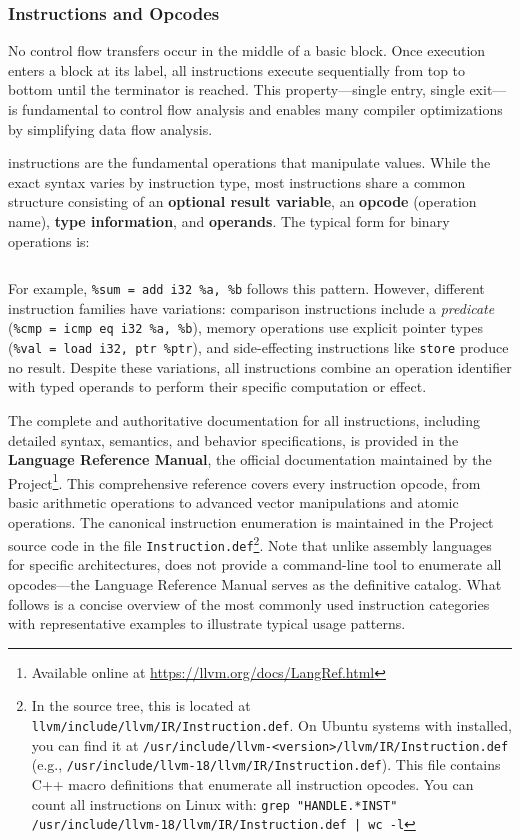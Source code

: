 \subsubsection{Instructions and Opcodes}

No control flow transfers occur in the middle of a basic block. Once execution enters a block at its label, all instructions execute sequentially from top to bottom until the terminator is reached. This property---single entry, single exit---is fundamental to control flow analysis and enables many compiler optimizations by simplifying data flow analysis.

 instructions are the fundamental operations that manipulate values. While the exact syntax varies by instruction type, most instructions share a common structure consisting of an \textbf{optional result variable}, an \textbf{opcode} (operation name), \textbf{type information}, and \textbf{operands}. The typical form for binary operations is:

\begin{lstlisting}[style=ir]
%result = opcode type operand1, operand2
\end{lstlisting}

For example, \texttt{\%sum = add i32 \%a, \%b} follows this pattern. However, different instruction families have variations: comparison instructions include a \textit{predicate} (\texttt{\%cmp = icmp eq i32 \%a, \%b}), memory operations use explicit pointer types (\texttt{\%val = load i32, ptr \%ptr}), and side-effecting instructions like \texttt{store} produce no result. Despite these variations, all instructions combine an operation identifier with typed operands to perform their specific computation or effect.

The complete and authoritative documentation for all   instructions, including detailed syntax, semantics, and behavior specifications, is provided in the \textbf{ Language Reference Manual}, the official documentation maintained by the  Project\footnote{Available online at \url{https://llvm.org/docs/LangRef.html}}. This comprehensive reference covers every instruction opcode, from basic arithmetic operations to advanced vector manipulations and atomic operations. The canonical instruction enumeration is maintained in the  Project source code in the file \texttt{Instruction.def}\footnote{In the  source tree, this is located at \texttt{llvm/include/llvm/IR/Instruction.def}. On Ubuntu systems with  installed, you can find it at \texttt{/usr/include/llvm-<version>/llvm/IR/Instruction.def} (e.g., \texttt{/usr/include/llvm-18/llvm/IR/Instruction.def}). This file contains C++ macro definitions that enumerate all instruction opcodes. You can count all instructions on Linux with: \texttt{grep "HANDLE.*INST" /usr/include/llvm-18/llvm/IR/Instruction.def | wc -l}}. Note that unlike assembly languages for specific architectures,  does not provide a command-line tool to enumerate all opcodes---the Language Reference Manual serves as the definitive catalog. What follows is a concise overview of the most commonly used instruction categories with representative examples to illustrate typical usage patterns.

